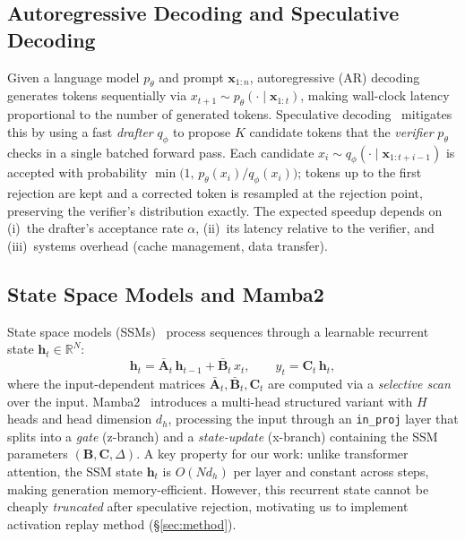 \subsection{Autoregressive Decoding and Speculative Decoding}

Given a language model $p_\theta$ and prompt $\mathbf{x}_{1:n}$, autoregressive (AR) decoding generates tokens sequentially via $x_{t+1} \sim p_\theta(\cdot \mid \mathbf{x}_{1:t})$, making wall-clock latency proportional to the number of generated tokens.
Speculative decoding~\citep{leviathan2023fast,chen2023accelerating} mitigates this by using a fast \emph{drafter} $q_\phi$ to propose $K$ candidate tokens that the \emph{verifier} $p_\theta$ checks in a single batched forward pass.
Each candidate $x_i \sim q_\phi(\cdot \mid \mathbf{x}_{1:t+i-1})$ is accepted with probability $\min\big(1,\, p_\theta(x_i)/q_\phi(x_i)\big)$; tokens up to the first rejection are kept and a corrected token is resampled at the rejection point, preserving the verifier's distribution exactly.
The expected speedup depends on (i)~the drafter's acceptance rate $\alpha$, (ii)~its latency relative to the verifier, and (iii)~systems overhead (cache management, data transfer).

\subsection{State Space Models and Mamba2}

State space models (SSMs)~\citep{gu2022efficiently,gu2023mamba} process sequences through a learnable recurrent state $\mathbf{h}_t \in \mathbb{R}^{N}$:
\begin{equation}
  \mathbf{h}_t = \bar{\mathbf{A}}_t\, \mathbf{h}_{t-1} + \bar{\mathbf{B}}_t\, x_t, \qquad y_t = \mathbf{C}_t\, \mathbf{h}_t,
  \label{eq:ssm}
\end{equation}
where the input-dependent matrices $\bar{\mathbf{A}}_t, \bar{\mathbf{B}}_t, \mathbf{C}_t$ are computed via a \emph{selective scan} over the input.
Mamba2~\citep{dao2024transformers} introduces a multi-head structured variant with $H$ heads and head dimension $d_h$, processing the input through an \texttt{in\_proj} layer that splits into a \emph{gate} (z-branch) and a \emph{state-update} (x-branch) containing the SSM parameters $(\mathbf{B}, \mathbf{C}, \Delta)$.
A key property for our work: unlike transformer attention, the SSM state $\mathbf{h}_t$ is $O(Nd_h)$ per layer and constant across steps, making generation memory-efficient.
However, this recurrent state cannot be cheaply \emph{truncated} after speculative rejection, motivating us to implement activation replay method (\S\ref{sec:method}).
